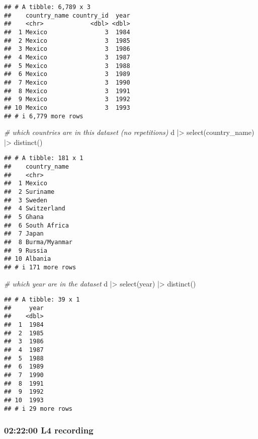 \documentclass[
]{article}
\newenvironment{Shaded}{\begin{snugshade}}{\end{snugshade}}
\newcommand{\CommentTok}[1]{\textcolor[rgb]{0.56,0.35,0.01}{\textit{#1}}}
\newcommand{\FunctionTok}[1]{\textcolor[rgb]{0.00,0.00,0.00}{#1}}
\newcommand{\NormalTok}[1]{#1}
\newcommand{\SpecialCharTok}[1]{\textcolor[rgb]{0.00,0.00,0.00}{#1}}
\begin{document}
\begin{verbatim}
## # A tibble: 6,789 x 3
##    country_name country_id  year
##    <chr>             <dbl> <dbl>
##  1 Mexico                3  1984
##  2 Mexico                3  1985
##  3 Mexico                3  1986
##  4 Mexico                3  1987
##  5 Mexico                3  1988
##  6 Mexico                3  1989
##  7 Mexico                3  1990
##  8 Mexico                3  1991
##  9 Mexico                3  1992
## 10 Mexico                3  1993
## # i 6,779 more rows
\end{verbatim}

\begin{Shaded}
\begin{Highlighting}[]
\CommentTok{\# which countries are in this dataset (no repetitions)}
\NormalTok{d }\SpecialCharTok{|\textgreater{}} \FunctionTok{select}\NormalTok{(country\_name) }\SpecialCharTok{|\textgreater{}} \FunctionTok{distinct}\NormalTok{()}
\end{Highlighting}
\end{Shaded}

\begin{verbatim}
## # A tibble: 181 x 1
##    country_name 
##    <chr>        
##  1 Mexico       
##  2 Suriname     
##  3 Sweden       
##  4 Switzerland  
##  5 Ghana        
##  6 South Africa 
##  7 Japan        
##  8 Burma/Myanmar
##  9 Russia       
## 10 Albania      
## # i 171 more rows
\end{verbatim}

\begin{Shaded}
\begin{Highlighting}[]
\CommentTok{\# which year are in the dataset}
\NormalTok{d }\SpecialCharTok{|\textgreater{}} \FunctionTok{select}\NormalTok{(year) }\SpecialCharTok{|\textgreater{}} \FunctionTok{distinct}\NormalTok{()}
\end{Highlighting}
\end{Shaded}

\begin{verbatim}
## # A tibble: 39 x 1
##     year
##    <dbl>
##  1  1984
##  2  1985
##  3  1986
##  4  1987
##  5  1988
##  6  1989
##  7  1990
##  8  1991
##  9  1992
## 10  1993
## # i 29 more rows
\end{verbatim}

\hypertarget{l4-recording}{%
\subsubsection{02:22:00 L4 recording}\label{l4-recording}}
\end{document}
